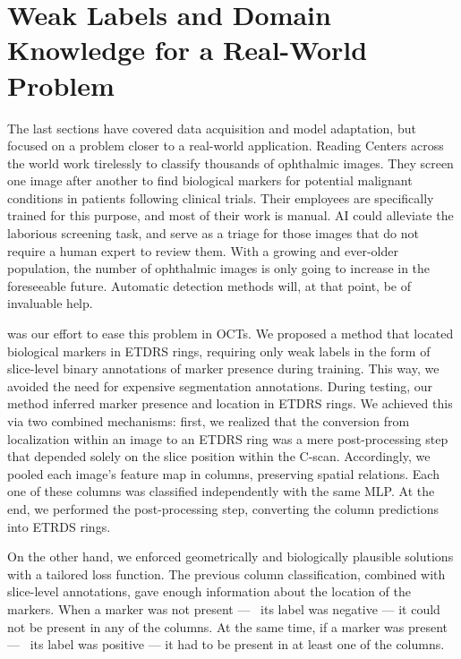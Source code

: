 \section{Weak Labels and Domain Knowledge for a Real-World Problem}\label{sec:disc_oct}

The last sections have covered data acquisition and model adaptation, but  focused on a problem closer to a real-world application. Reading Centers across the world work tirelessly to classify thousands of ophthalmic images. They screen one image after another to find biological markers for potential malignant conditions in patients following clinical trials. Their employees are specifically trained for this purpose, and most of their work is manual. AI could alleviate the laborious screening task, and serve as a triage for those images that do not require a human expert to review them. With a growing and ever-older population, the number of ophthalmic images is only going to increase in the foreseeable future. Automatic detection methods will, at that point, be of invaluable help.

 was our effort to ease this problem in OCTs. We proposed a method that located biological markers in ETDRS rings, requiring only weak labels in the form of slice-level binary annotations of marker presence during training. This way, we avoided the need for expensive segmentation annotations. During testing, our method inferred marker presence and location in ETDRS rings. We achieved this via two combined mechanisms: first, we realized that the conversion from localization within an image to an ETDRS ring was a mere post-processing step that depended solely on the slice position within the C-scan. Accordingly, we pooled each image's feature map in columns, preserving spatial relations. Each one of these columns was classified independently with the same MLP. At the end, we performed the post-processing step, converting the column predictions into ETRDS rings.

On the other hand, we enforced geometrically and biologically plausible solutions with a tailored loss function. The previous column classification, combined with slice-level annotations, gave enough information about the location of the markers. When a marker was not present --- \ie~its label was negative --- it could not be present in any of the columns. At the same time, if a marker was present --- \ie~its label was positive --- it had to be present in at least one of the columns. 

